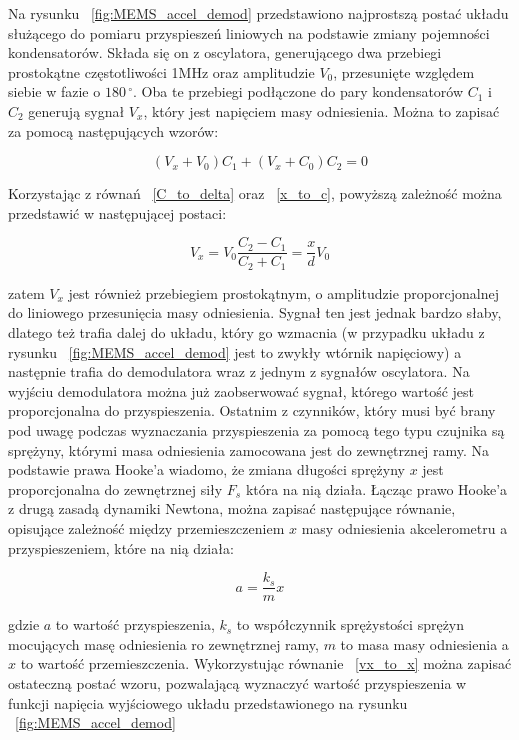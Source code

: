 Na rysunku ~\ref{fig:MEMS_accel_demod} przedstawiono najprostszą postać układu służącego do pomiaru przyspieszeń liniowych na podstawie zmiany pojemności kondensatorów. Składa się on z oscylatora, generującego dwa przebiegi prostokątne częstotliwości 1MHz oraz amplitudzie $V_0$, przesunięte względem siebie w fazie o $180\,^{\circ}$. Oba te przebiegi podłączone do pary kondensatorów $C_1$ i $C_2$ generują sygnał $V_x$, który jest napięciem masy odniesienia. Można to zapisać za pomocą następujących wzorów:

\begin{equation}
	(V_x + V_0)C_1 + (V_x + C_0)C_2 = 0
\end{equation}  

Korzystając z równań ~\ref{C_to_delta} oraz ~\ref{x_to_c}, powyższą zależność można przedstawić w następującej postaci:

\begin{equation}
V_x = V_0\frac{C_2 - C_1}{C_2 + C_1} = \frac{x}{d}V_0
\label{vx_to_x}
\end{equation}

zatem $V_x$ jest również przebiegiem prostokątnym, o amplitudzie proporcjonalnej do liniowego przesunięcia masy odniesienia. Sygnał ten jest jednak bardzo słaby, dlatego też trafia dalej do układu, który go wzmacnia (w przypadku układu z rysunku ~\ref{fig:MEMS_accel_demod} jest to zwykły wtórnik napięciowy) a następnie trafia do demodulatora wraz z jednym z sygnałów oscylatora. Na wyjściu demodulatora można już zaobserwować sygnał, którego wartość jest proporcjonalna do przyspieszenia. Ostatnim z czynników, który musi być brany pod uwagę podczas wyznaczania przyspieszenia za pomocą tego typu czujnika są sprężyny, którymi masa odniesienia zamocowana jest do zewnętrznej ramy. Na podstawie prawa Hooke'a wiadomo, że zmiana długości sprężyny $x$ jest proporcjonalna do zewnętrznej siły $F_s$ która na nią działa. Łącząc prawo Hooke'a z drugą zasadą dynamiki Newtona, można zapisać następujące równanie, opisujące zależność między przemieszczeniem $x$ masy odniesienia akcelerometru a przyspieszeniem, które na nią działa:

\begin{equation}
	a = \frac{k_s}{m}x
\end{equation}  

gdzie $a$ to wartość przyspieszenia, $k_s$ to współczynnik sprężystości sprężyn mocujących masę odniesienia ro zewnętrznej ramy, $m$ to masa masy odniesienia a $x$ to wartość przemieszczenia. Wykorzystując równanie ~\ref{vx_to_x} można zapisać ostateczną postać wzoru, pozwalającą wyznaczyć wartość przyspieszenia w funkcji napięcia wyjściowego układu przedstawionego na rysunku ~\ref{fig:MEMS_accel_demod}

